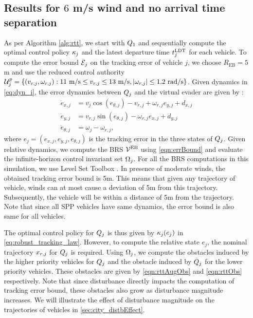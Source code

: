 \subsection{Results for $6$ m/s wind and no arrival time separation\label{sec:city_simResults}}
As per Algorithm \ref{alg:rtt}, we start with $Q_1$ and sequentially compute the optimal control policy $\kappa_j$ and the latest departure time $t^\text{LDT}_j$ for each vehicle. To compute the error bound $\mathcal{E}_j$ on the tracking error of vehicle $j$, we choose $R_{\text{EB}} = 5$ m and use the reduced control authority $\mathcal{U}^p_j = \{(v_{r,j}, \omega_{r,j}): 11 \text{ m/s} \leq v_{r,j} \leq 13 \text{ m/s}, |\omega_{r,j}| \leq 1.2 \text{ rad/s}\}$. Given dynamics in \eqref{eq:dyn_i}, the error dynamics between $Q_j$ and the virtual evader are given by \cite{Mitchell05}:
\begin{equation}
\label{eq:reldyn}
\begin{aligned}
\dot{e}_{x,j} &= v_{j} \cos(e_{\theta,j}) - v_{r,j} + \omega_{r,j}{e}_{y,j} + d_{x,j}\\
\dot{e}_{y,j} &= v_{r,j}\sin(e_{\theta,j}) - \omega_{r,j}{e}_{x,j} + d_{y,j}\\
\dot{e}_{\theta,j} &= \omega_{j} - \omega_{r,j},
\end{aligned}
\end{equation}    
where $e_j = ({e}_{x,j}, {e}_{y,j}, {e}_{\theta,j})$ is the tracking error in the three states of $Q_j$. Given relative dynamics, we compute the BRS $\mathcal{V}^{\text{EB}}$ using \eqref{eqn:errBound} and evaluate the infinite-horizon control invariant set $\Omega_j$. For all the BRS computations in this simulation, we use Level Set Toolbox \cite{Mitchell07b}. In presence of moderate winds, the obtained tracking error bound is 5m. This means that given any trajectory of vehicle, winds can at most cause a deviation of 5m from this trajectory. Subsequently, the vehicle will be within a distance of 5m from the trajectory. Note that since all SPP vehicles have same dynamics, the error bound is also same for all vehicles. 

The optimal control policy for $Q_j$ is thus given by $\kappa_j(e_j)$ in \eqref{eq:robust_tracking_law}. However, to compute the relative state $e_j$, the nominal trajectory $x_{r,j}$ for $Q_j$ is required. Using $\Omega_j$, we compute the obstacles induced by the higher priority vehicles for $Q_j$ and the obstacle induced by $Q_j$ for the lower priority vehicles. These obstacles are given by \eqref{eqn:rttAugObs} and \eqref{eqn:rttObs} respectively. Note that since disturbance directly impacts the computation of tracking error bound, these obstacles also grow as disturbance magnitude increases. We will illustrate the effect of disturbance magnitude on the trajectories of vehicles in \ref{sec:city_distbEffect}.

